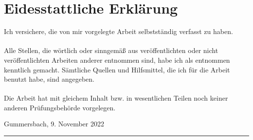 
\chapter*{Eidesstattliche Erklärung}

\addchaptertocentry{\authorshipname} %

\noindent Ich versichere, die von mir vorgelegte Arbeit selbstständig verfasst zu haben. \\ \\


\noindent Alle Stellen, die wörtlich oder sinngemäß aus veröffentlichten oder nicht veröffentlichten Arbeiten anderer entnommen sind, habe ich als entnommen kenntlich gemacht. Sämtliche Quellen und Hilfsmittel, die ich für die Arbeit benutzt habe, sind angegeben. \\ \\


\noindent Die Arbeit hat mit gleichem Inhalt bzw. in wesentlichen Teilen noch keiner anderen Prüfungsbehörde vorgelegen.

\vspace{1cm}  

\noindent Gummersbach, 9. November 2022  
 
 
\vspace{2.5cm} 
 

\noindent \rule[0.5em]{25em}{0.5pt} \\ %
\noindent \authorname
